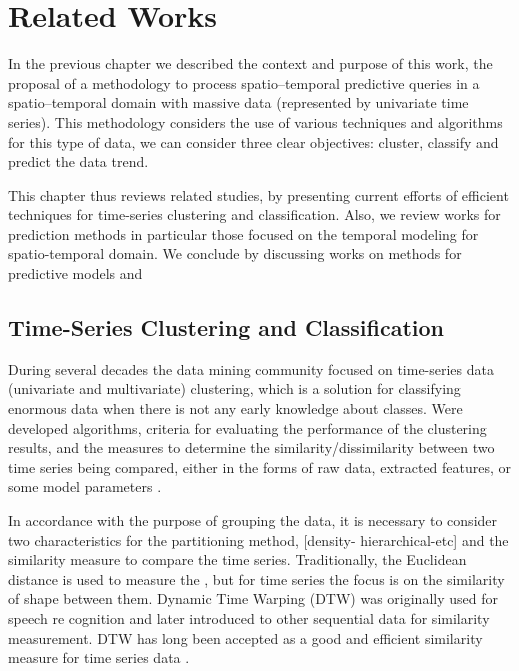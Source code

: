 \chapter{Related Works}
\label{chapter_Related_Works}

In the previous chapter we described the context and purpose of this work, the proposal of a methodology to process spatio--temporal predictive queries in a spatio--temporal domain with massive data (represented by univariate time series). This methodology considers the use of various techniques and algorithms for this type of data, we can consider three clear objectives: cluster, classify and predict the data trend. 

This chapter thus reviews related studies, by presenting current efforts of efficient techniques for time-series clustering and classification. Also, we review works for prediction methods in particular those focused on the temporal modeling for spatio-temporal domain. We conclude by discussing works on methods for predictive models and 

\section{Time-Series Clustering and Classification}
\label{Sec:ClusteringRelatedWorks}

During several decades the data mining community focused on time-series data (univariate and multivariate) clustering, which is a solution for classifying enormous data when there is not any early knowledge about classes. Were developed algorithms, criteria for evaluating the performance of the clustering results, and the measures to determine the similarity/dissimilarity between two time series being compared, either in the forms of raw data, extracted features, or some model parameters \cite{Liao2005, Aghabozorgi2015}.
% 

In accordance with the purpose of grouping the data, it is necessary to consider two characteristics for the partitioning method, [density- hierarchical-etc] and the similarity measure to compare the time series. Traditionally, the Euclidean distance is used to measure the , but for time series the focus is on the similarity of shape between them. Dynamic Time Warping (DTW) was originally used for speech re cognition and later introduced to other sequential data for similarity measurement. DTW has long been accepted as a good and efficient similarity measure for time series data \cite{}.

